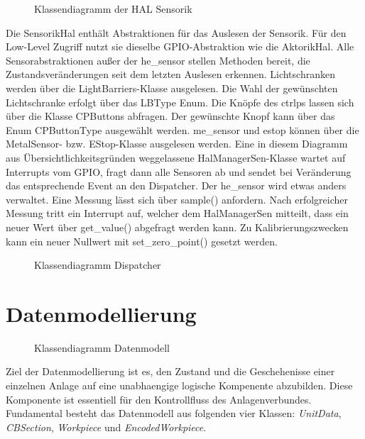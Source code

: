 \begin{figure}
    \caption{Klassendiagramm der HAL Sensorik}
    \label{fig:cd-hal-sens}
\end{figure}

Die Sensorik\-Hal enthält Abstraktionen für das Auslesen der Sensorik.
Für den Low-Level Zugriff nutzt sie dieselbe GPIO-Abstraktion wie die Aktorik\-Hal.
Alle Sensorabstraktionen außer der \gls{he_sensor} stellen Methoden bereit, die Zustandsveränderungen
seit dem letzten Auslesen erkennen.
Lichtschranken werden über die LightBarriers-Klasse ausgelesen.
Die Wahl der gewünschten Lichtschranke erfolgt über das LBType Enum.
Die Knöpfe des \gls{ctrlp}s lassen sich über die Klasse CPButtons abfragen.
Der gewünschte Knopf kann über das Enum CPButtonType ausgewählt werden.
\Gls{me_sensor} und \gls{estop} können über die MetalSensor- bzw. EStop-Klasse ausgelesen werden.
Eine in diesem Diagramm aus Übersichtlichkeitsgründen weggelassene HalManagerSen-Klasse wartet
auf Interrupts vom GPIO, fragt dann alle Sensoren ab und sendet bei Veränderung das entsprechende
Event an den Dispatcher.
Der \gls{he_sensor} wird etwas anders verwaltet. Eine Messung lässt sich über sample() anfordern.
Nach erfolgreicher Messung tritt ein Interrupt auf, welcher dem HalManagerSen mitteilt,
dass ein neuer Wert über get\_value() abgefragt werden kann.
Zu Kalibrierungszwecken kann ein neuer Nullwert mit set\_zero\_point() gesetzt werden.


\begin{figure}
    \caption{Klassendiagramm Dispatcher}
    \label{fig:cd-dispatcher}
\end{figure}


\FloatBarrier
\section{Datenmodellierung}\label{sec:datenmodellierung}

\begin{figure}
    \caption{Klassendiagramm Datenmodell}
    \label{fig:cd-datamodel}
\end{figure}

Ziel der Datenmodellierung ist es, den Zustand und die Geschehenisse einer
einzelnen Anlage auf eine unabhaengige logische Kompenente abzubilden.
Diese Komponente ist essentiell für den Kontrollfluss des Anlagenverbundes.
Fundamental besteht das Datenmodell aus folgenden vier Klassen: \textit{UnitData}, \textit{CBSection},
\textit{Workpiece} und \textit{EncodedWorkpiece}.

